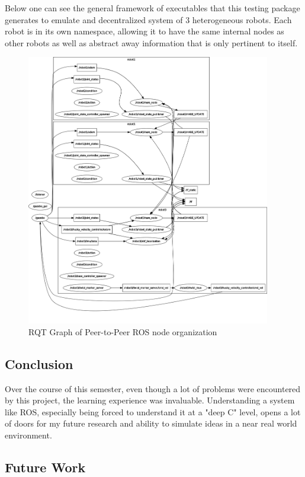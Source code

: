 Below one can see the general framework of executables that this testing package generates to emulate
and decentralized system of 3 heterogeneous robots. Each robot is in its own namespace, allowing it
to have the same internal nodes as other robots as well as abstract away information that is only
pertinent to itself.

\begin{figure}[H]
  \centering
    \includegraphics[width=0.95\textwidth]{rosgraph}
  \caption{RQT Graph of Peer-to-Peer ROS node organization}
  \label{fig:rosgraph}
\end{figure}

\subsection{Conclusion}

Over the course of this semester, even though a lot of problems were encountered
by this project, the learning experience was invaluable. Understanding a system like
ROS, especially being forced to understand it at a "deep C" level, opens a lot of doors
for my future research and ability to simulate ideas in a near real world environment.


\subsection{Future Work}

